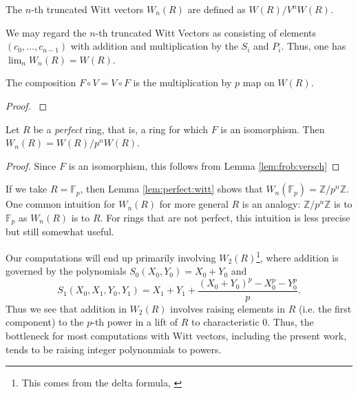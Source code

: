 \begin{defn}
	The \(n\)-th truncated Witt vectors
	\(W_{n}(R)\) are defined as
	\(W(R) / V^{n}W(R)\).
\end{defn}

We may regard the \(n\)-th truncated Witt Vectors as consisting
of elements \((c_{0}, \ldots, c_{n-1})\) with addition
and multiplication by the \(S_{i}\) and \(P_{i}\).
Thus, one has \(\lim_{n} W_{n}(R) = W(R)\).

\begin{lem}
    \label{lem:frob:versch}
	The composition \(F \circ V = V \circ F\) is the multiplication by
	\(p\) map on \(W(R)\).
\end{lem}

\begin{proof}
	\cite[Proposition~5]{kim-2017-witt-vec}
\end{proof}

\begin{lem}
    \label{lem:perfect:witt}
    Let \(R\) be a \textit{perfect} ring,
    that is, a ring for which \(F\) is an isomorphism.
    Then \(W_{n}(R) = W(R) / p^{n}W(R)\).
\end{lem}

\begin{proof}
    Since \(F\) is an isomorphism, this follows from 
    Lemma \ref{lem:frob:versch}
\end{proof}

\begin{rmk}
    If we take \(R = \mathbb{F}_{p}\), then
    Lemma \ref{lem:perfect:witt}
    shows that \(W_{n}(\mathbb{F}_{p}) = \mathbb{Z} / p^{n}\mathbb{Z}\).
    One common intuition for \(W_{n}(R)\)
    for more general \(R\) is an analogy:
    \(\mathbb{Z} / p^{n}\mathbb{Z}\) 
    is to \(\mathbb{F}_{p}\) 
    as \(W_{n}(R)\) is to \(R\).
    For rings that are not perfect,
    this intuition is less precise but still
    somewhat useful.
\end{rmk}

\begin{rmk}
	\label{rmk:polyraise:w2}
    Our computations will end up primarily involving
    \(W_{2}(R)\)\footnote{
    This comes from the delta formula,
    \cite[Theorem~D]{kty-2022-fedder}},
    where addition is governed by the polynomials
	\(S_{0}(X_{0}, Y_{0}) = X_{0} + Y_{0}\)
	and
	\[
		S_{1}(X_{0}, X_{1}, Y_{0}, Y_{1})
		= X_{1} + Y_{1} + 
		\frac{(X_{0} + Y_{0})^{p} - X_{0}^{p} - Y_{0}^{p}}{p}
	.\] 
	Thus we see that addition in \(W_{2}(R)\) involves raising 
	elements in \(R\) (i.e. the first component) to the \(p\)-th
	power in a lift of \(R\) to characteristic 0.
    Thus, the bottleneck for most computations with Witt vectors,
    including the present work, tends to be raising
    integer polynonmials to powers.
\end{rmk}

